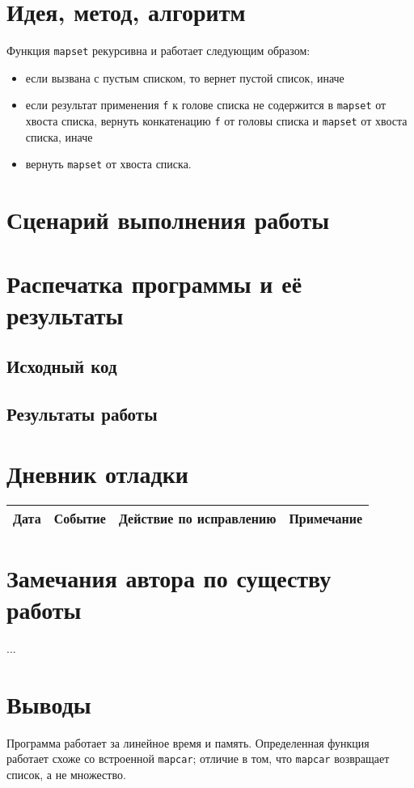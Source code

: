 \documentclass[12pt]{article}
\begin{document}
\section{Идея, метод, алгоритм}
Функция {\tt mapset} рекурсивна и работает следующим образом:
\begin{itemize}
\setlength{\itemsep}{-1mm} %
\item если вызвана с пустым списком, то вернет пустой список, иначе
\item если результат применения {\tt f} к голове списка не содержится в {\tt mapset} от хвоста списка, вернуть конкатенацию {\tt f} от головы списка и {\tt mapset} от хвоста списка, иначе
\item вернуть {\tt mapset} от хвоста списка.
\end{itemize}

\section{Сценарий выполнения работы}

\section{Распечатка программы и её результаты}

\subsection{Исходный код}


\subsection{Результаты работы}


\section{Дневник отладки}
\begin{tabular}{|c|c|c|c|}
\hline
Дата & Событие & Действие по исправлению & Примечание \\
\hline
\end{tabular}

\section{Замечания автора по существу работы}
...

\section{Выводы}
Программа работает за линейное время и память. Определенная функция работает схоже со встроенной {\tt mapcar}; отличие в том, что {\tt mapcar} возвращает список, а не множество.
\end{document}
